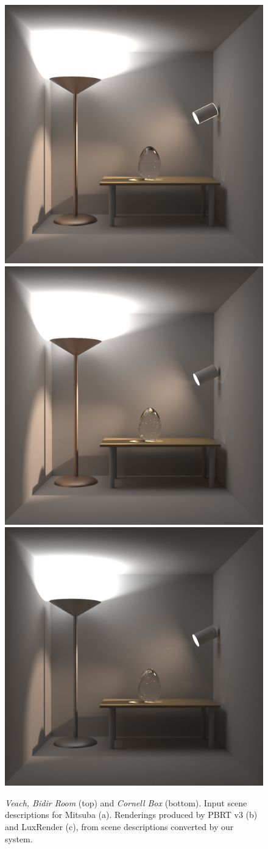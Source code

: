 \begin{figure}
\centering
\includegraphics[width=0.25\linewidth]{figs/4_results/veach-bidir/1_from_mitsuba.png}
\includegraphics[width=0.25\linewidth]{figs/4_results/veach-bidir/2_to_pbrt.png}
\includegraphics[width=0.25\linewidth]{figs/4_results/veach-bidir/3_to_lux.png}
\caption{\textit{Veach, Bidir Room} (top) and \textit{Cornell Box} (bottom). Input scene descriptions for 
 Mitsuba (a). Renderings produced by PBRT v3 (b) and LuxRender (c),
 from scene descriptions converted by our system.}
\label{fig:bidir-cornell}
\end{figure}

